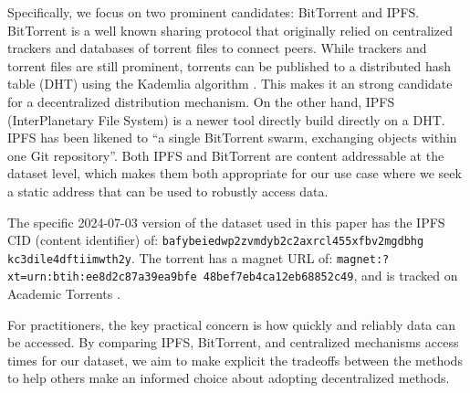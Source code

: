 \documentclass[10pt,twocolumn,letterpaper]{article}
\begin{document}
Specifically, we focus on two prominent candidates:
BitTorrent and IPFS.
BitTorrent \cite{cohen_incentives_2003, cohen_bittorrent_2017} is a well known sharing protocol that
  originally relied on centralized trackers and databases of torrent files to connect peers.
While trackers and torrent files are still prominent, torrents can be published to a distributed hash table
  (DHT) using the Kademlia algorithm \cite{maymounkov_kademlia_2002}.
This makes it an strong candidate for a decentralized distribution mechanism.
On the other hand, IPFS (InterPlanetary File System) \cite{benet_ipfs_2014, bieri_overview_2021} is a newer
  tool directly build directly on a DHT.
IPFS has been likened to ``a single BitTorrent swarm, exchanging objects within one Git repository''.
Both IPFS and BitTorrent are content addressable at the dataset level, which makes them both appropriate for
  our use case where we seek a static address that can be used to robustly access data.


The specific 2024-07-03 version of the dataset used in this paper has the IPFS CID (content identifier) of:
{\tt bafybeiedwp2zvmdyb2c2axrcl455xfbv2mgdbhg kc3dile4dftiimwth2y}.
The torrent has a magnet URL of:
{\tt magnet:?xt=urn:btih:ee8d2c87a39ea9bfe 48bef7eb4ca12eb68852c49}, and is 
tracked on Academic Torrents \cite{academic_torrents_Cohen2014}.

For practitioners, the key practical concern is how quickly and reliably data can be accessed.
By comparing IPFS, BitTorrent, and centralized mechanisms access times for our dataset, we aim to make
  explicit the tradeoffs between the methods to help others make an informed choice about adopting
  decentralized methods.

\end{document}
